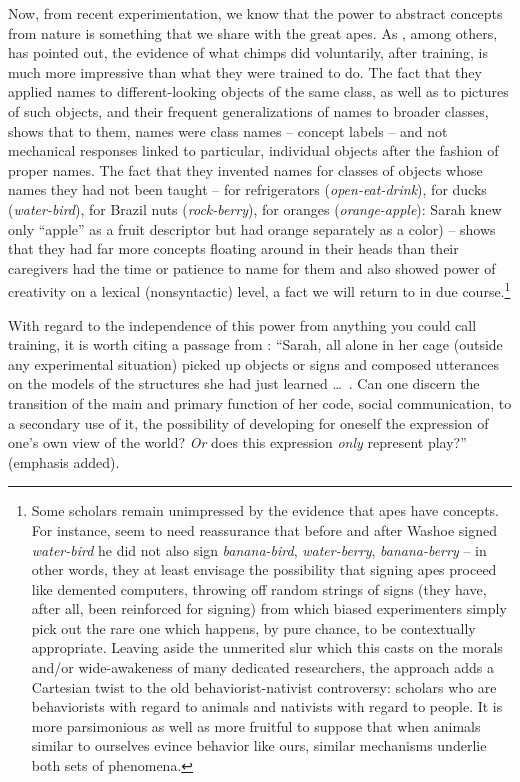 Now, from recent experimentation, we know that the power to abstract concepts from nature is something that we share with the great apes. As \citet{Mounin1976}, among others, has pointed out, the evidence of what chimps did voluntarily, after training, is much more
impressive than what they were trained to do. The fact that they applied names to different-looking objects of the same class, as well as to pictures of such objects, and their frequent generalizations of names to broader classes, shows that to them, names were class names -- concept labels -- and not mechanical responses linked to particular, individual objects after the fashion of proper names. The fact that they invented names for classes of objects whose names they had not been taught -- for refrigerators (\textit{open-eat-drink}), for ducks (\textit{water-bird}), for Brazil nuts (\textit{rock-berry}), for oranges (\textit{orange-apple}): Sarah knew only ``apple'' as a fruit descriptor but had orange separately as a color) -- shows that they had far more concepts floating around in their heads than their caregivers had the time or patience to name for them and also showed power of creativity on a lexical (nonsyntactic) level, a fact we will return to in due course.\footnote{Some scholars remain unimpressed by the evidence that apes have concepts. For instance, \citet{Seidenberg1979} seem to need reassurance that before and after Washoe signed \textit{water-bird} he did not also sign \textit{banana-bird}, \textit{water-berry}, \textit{banana-berry} -- in other words, they at least envisage the possibility that signing apes proceed like demented computers, throwing off random strings of signs (they have, after all, been reinforced for signing) from which biased experimenters simply pick out the rare one which happens, by pure chance, to be contextually appropriate. Leaving aside the unmerited slur which this casts on the morals and/or wide-awakeness of many dedicated researchers, the approach adds a Cartesian twist to the old behaviorist-nativist controversy: scholars who are behaviorists with regard to animals and nativists with regard to people. It is more parsimonious as well as more fruitful to suppose that when animals similar to ourselves evince behavior like ours, similar mechanisms underlie both sets of phenomena.}

With regard to the independence of this power from anything you could call training, it is worth citing a passage from \citet{Mounin1976}: ``Sarah, all alone in her cage (outside any experimental situation) picked up objects or signs and composed utterances on the models of the structures she had just learned \ldots~. Can one discern the transition of the main and primary function of her code, social communication, to a secondary use of it, the possibility of developing for oneself the expression of one's own view of the world? \textit{Or} does this expression \textit{only} represent play?'' (emphasis added).

